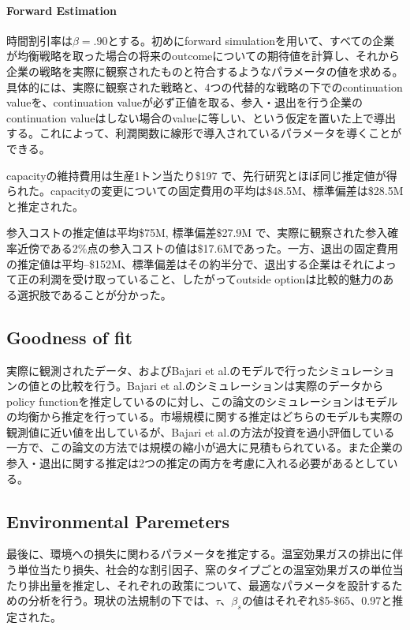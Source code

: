 \documentclass[11pt]{jsarticle}
\begin{document}
\paragraph{Forward Estimation}

時間割引率は$\beta = .90$とする。初めにforward simulationを用いて、すべての企業が均衡戦略を取った場合の将来のoutcomeについての期待値を計算し、それから企業の戦略を実際に観察されたものと符合するようなパラメータの値を求める。具体的には、実際に観察された戦略と、4つの代替的な戦略の下でのcontinuation valueを、continuation valueが必ず正値を取る、参入・退出を行う企業のcontinuation valueはしない場合のvalueに等しい、という仮定を置いた上で導出する。これによって、利潤関数に線形で導入されているパラメータを導くことができる。

capacityの維持費用は生産1トン当たり\$197 で、先行研究とほぼ同じ推定値が得られた。capacityの変更についての固定費用の平均は\$48.5M、標準偏差は\$28.5M と推定された。

参入コストの推定値は平均\$75M, 標準偏差\$27.9M で、実際に観察された参入確率近傍である2\%点の参入コストの値は\$17.6Mであった。一方、退出の固定費用の推定値は平均--\$152M、標準偏差はその約半分で、退出する企業はそれによって正の利潤を受け取っていること、したがってoutside optionは比較的魅力のある選択肢であることが分かった。

\subsection{Goodness of fit}

実際に観測されたデータ、およびBajari et al.のモデルで行ったシミュレーションの値との比較を行う。Bajari et al.のシミュレーションは実際のデータからpolicy functionを推定しているのに対し、この論文のシミュレーションはモデルの均衡から推定を行っている。市場規模に関する推定はどちらのモデルも実際の観測値に近い値を出しているが、Bajari et al.の方法が投資を過小評価している一方で、この論文の方法では規模の縮小が過大に見積もられている。また企業の参入・退出に関する推定は2つの推定の両方を考慮に入れる必要があるとしている。


\subsection{Environmental Paremeters}

最後に、環境への損失に関わるパラメータを推定する。温室効果ガスの排出に伴う単位当たり損失、社会的な割引因子、窯のタイプごとの温室効果ガスの単位当たり排出量を推定し、それぞれの政策について、最適なパラメータを設計するための分析を行う。現状の法規制の下では、$\tau$、$\beta_s$の値はそれぞれ\$5-\$65、0.97と推定された。
\end{document}
